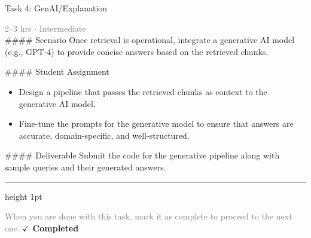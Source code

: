 \documentclass[10pt,a4paper]{article}
\begin{document}
\begin{taskbox}{Task 4: GenAI/Explanation}

    {\small \textcolor{gray}{2--3 hrs $\cdot$ Intermediate}}\\[12pt]

    \#\#\#\# Scenario  
Once retrieval is operational, integrate a generative AI model (e.g., GPT-4) to provide concise answers based on the retrieved chunks.  

\#\#\#\# Student Assignment  
\begin{itemize}
    \item Design a pipeline that passes the retrieved chunks as context to the generative AI model.  
    \item Fine-tune the prompts for the generative model to ensure that answers are accurate, domain-specific, and well-structured.  
\end{itemize}

\#\#\#\# Deliverable  
Submit the code for the generative pipeline along with sample queries and their generated answers.\par

    \vspace{16pt}

    \textcolor{cardBorder}{\hrule height 1pt}\vspace{8pt}

    \small \textcolor{gray}{When you are done with this task, mark it as complete to proceed to the next one.} \hfill \textbf{\textcolor{brandDark}{$\checkmark$ Completed}}

\end{taskbox}
\end{document}
